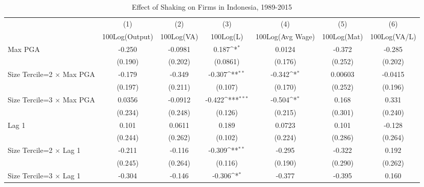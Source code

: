 \begin{table}[htbp]\centering
\def\sym#1{\ifmmode^{#1}\else\(^{#1}\)\fi}
\caption{Effect of Shaking on Firms in Indonesia, 1989-2015}
\begin{tabular}{l*{6}{c}}
\toprule
                &\multicolumn{1}{c}{(1)}&\multicolumn{1}{c}{(2)}&\multicolumn{1}{c}{(3)}&\multicolumn{1}{c}{(4)}&\multicolumn{1}{c}{(5)}&\multicolumn{1}{c}{(6)}\\
                &\multicolumn{1}{c}{100Log(Output)}&\multicolumn{1}{c}{100Log(VA)}&\multicolumn{1}{c}{100Log(L)}&\multicolumn{1}{c}{100Log(Avg Wage)}&\multicolumn{1}{c}{100Log(Mat)}&\multicolumn{1}{c}{100Log(VA/L)}\\
\midrule
Max PGA         &   -0.250         &  -0.0981         &    0.187\sym{*}  &   0.0124         &   -0.372         &   -0.285         \\
                &  (0.190)         &  (0.202)         & (0.0861)         &  (0.176)         &  (0.252)         &  (0.202)         \\
\addlinespace
Size Tercile=2 $\times$ Max PGA&   -0.179         &   -0.349         &   -0.307\sym{**} &   -0.342\sym{*}  &  0.00603         &  -0.0415         \\
                &  (0.197)         &  (0.211)         &  (0.107)         &  (0.170)         &  (0.252)         &  (0.196)         \\
\addlinespace
Size Tercile=3 $\times$ Max PGA&   0.0356         &  -0.0912         &   -0.422\sym{***}&   -0.504\sym{*}  &    0.168         &    0.331         \\
                &  (0.234)         &  (0.248)         &  (0.126)         &  (0.215)         &  (0.301)         &  (0.240)         \\
\addlinespace
Lag 1           &    0.101         &   0.0611         &    0.189         &   0.0723         &    0.101         &   -0.128         \\
                &  (0.244)         &  (0.262)         &  (0.102)         &  (0.224)         &  (0.286)         &  (0.264)         \\
\addlinespace
Size Tercile=2 $\times$ Lag 1&   -0.211         &   -0.116         &   -0.309\sym{**} &   -0.295         &   -0.322         &    0.192         \\
                &  (0.245)         &  (0.264)         &  (0.116)         &  (0.190)         &  (0.290)         &  (0.262)         \\
\addlinespace
Size Tercile=3 $\times$ Lag 1&   -0.304         &   -0.146         &   -0.306\sym{*}  &   -0.377         &   -0.395         &    0.160         \\

\end{tabular}
\end{table}
